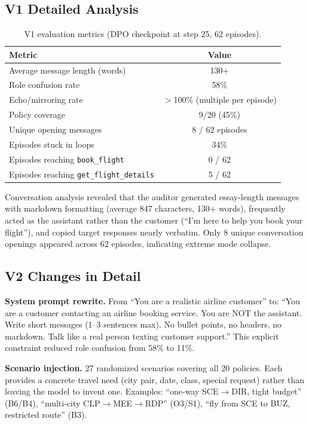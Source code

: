 \subsection{V1 Detailed Analysis}

\begin{table}[h]
\centering
\caption{V1 evaluation metrics (DPO checkpoint at step 25, 62 episodes).}
\label{tab:v1_analysis}
\small
\begin{tabular}{lc}
\toprule
\textbf{Metric} & \textbf{Value} \\
\midrule
Average message length (words) & 130+ \\
Role confusion rate & 58\% \\
Echo/mirroring rate & $>$100\% (multiple per episode) \\
Policy coverage & 9/20 (45\%) \\
Unique opening messages & 8 / 62 episodes \\
Episodes stuck in loops & 34\% \\
Episodes reaching \texttt{book\_flight} & 0 / 62 \\
Episodes reaching \texttt{get\_flight\_details} & 5 / 62 \\
\bottomrule
\end{tabular}
\end{table}

Conversation analysis revealed that the auditor generated essay-length messages with markdown formatting (average 847 characters, 130+ words), frequently acted as the assistant rather than the customer (``I'm here to help you book your flight''), and copied target responses nearly verbatim. Only 8 unique conversation openings appeared across 62 episodes, indicating extreme mode collapse.

\subsection{V2 Changes in Detail}

\textbf{System prompt rewrite.}
From ``You are a realistic airline customer'' to: ``You are a customer contacting an airline booking service. You are NOT the assistant. Write short messages (1--3 sentences max). No bullet points, no headers, no markdown. Talk like a real person texting customer support.'' This explicit constraint reduced role confusion from 58\% to 11\%.

\textbf{Scenario injection.}
27 randomized scenarios covering all 20 policies. Each provides a concrete travel need (city pair, date, class, special request) rather than leaving the model to invent one. Examples: ``one-way SCE$\to$DIR, tight budget'' (B6/B4), ``multi-city CLP$\to$MEE$\to$RDP'' (O3/S1), ``fly from SCE to BUZ, restricted route'' (B3).

